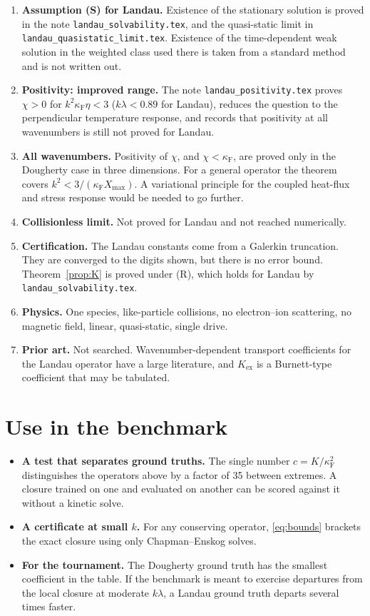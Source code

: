 \documentclass[11pt]{article}
\theoremstyle{remark}
\begin{document}
\begin{enumerate}
  \item \textbf{Assumption (S) for Landau.} Existence of the stationary
    solution is proved in the note \texttt{landau\_solvability.tex}, and
    the quasi-static limit in \texttt{landau\_quasistatic\_limit.tex}.
    Existence of the time-dependent weak solution in the weighted class used
    there is taken from a standard method and is not written out.
  \item \textbf{Positivity: improved range.} The note
    \texttt{landau\_positivity.tex} proves $\chi>0$ for
    $k^2\kappa_{\mathrm F}\eta<3$ ($k\lambda<0.89$ for Landau), reduces the
    question to the perpendicular temperature response, and records that
    positivity at all wavenumbers is still not proved for Landau.
  \item \textbf{All wavenumbers.} Positivity of $\chi$, and
    $\chi<\kappa_{\mathrm F}$, are proved only in the Dougherty case in
    three dimensions. For a general operator the theorem covers
    $k^2<3/(\kappa_{\mathrm F}X_{\max})$. A variational principle for the
    coupled heat-flux and stress response would be needed to go further.
  \item \textbf{Collisionless limit.} Not proved for Landau and not reached
    numerically.
  \item \textbf{Certification.} The Landau constants come from a Galerkin
    truncation. They are converged to the digits shown, but there is no
    error bound. Theorem~\ref{prop:K} is proved under (R), which holds
    for Landau by \texttt{landau\_solvability.tex}.
  \item \textbf{Physics.} One species, like-particle collisions, no
    electron--ion scattering, no magnetic field, linear, quasi-static,
    single drive.
  \item \textbf{Prior art.} Not searched. Wavenumber-dependent transport
    coefficients for the Landau operator have a large literature, and
    $K_{\mathrm{ex}}$ is a Burnett-type coefficient that may be tabulated.
\end{enumerate}

\section{Use in the benchmark}

\begin{itemize}
  \item \textbf{A test that separates ground truths.} The single number
    $c=K/\kappa_{\mathrm F}^2$ distinguishes the operators above by a factor
    of 35 between extremes. A closure trained on one and evaluated on
    another can be scored against it without a kinetic solve.
  \item \textbf{A certificate at small $k$.} For any conserving operator,
    \eqref{eq:bounds} brackets the exact closure using only Chapman--Enskog
    solves.
  \item \textbf{For the tournament.} The Dougherty ground truth has the
    smallest coefficient in the table. If the benchmark is meant to exercise
    departures from the local closure at moderate $k\lambda$, a Landau
    ground truth departs several times faster.
\end{itemize}
\end{document}
